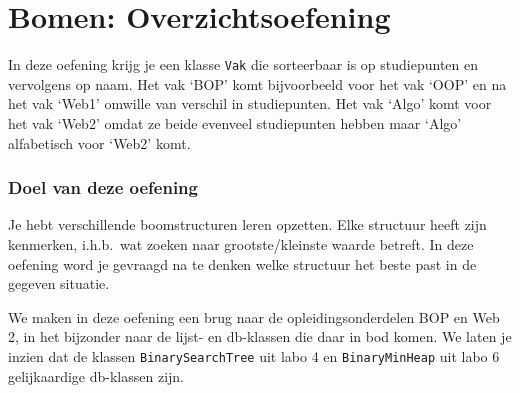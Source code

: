 \chapter{Bomen: Overzichtsoefening}

In deze oefening krijg je een klasse \verb/Vak/ die sorteerbaar is op studiepunten en vervolgens op naam. Het vak `BOP' komt bijvoorbeeld voor het vak `OOP' en na het vak `Web1' omwille van verschil  in studiepunten. Het vak `Algo' komt voor het vak `Web2' omdat ze beide evenveel studiepunten hebben maar `Algo' alfabetisch voor `Web2' komt.

\subsection*{Doel van deze oefening}
Je hebt verschillende boomstructuren leren opzetten. Elke structuur heeft zijn kenmerken, i.h.b.\ wat zoeken naar grootste/kleinste waarde betreft. In deze oefening word je gevraagd na te denken welke structuur het beste past in de gegeven situatie.

We maken in deze oefening een brug naar de opleidingsonderdelen BOP en Web 2, in het bijzonder naar de  lijst- en db-klassen die daar in bod komen. We laten je inzien dat de klassen  \verb/BinarySearchTree/ uit labo 4  en \verb/BinaryMinHeap/ uit labo 6 gelijkaardige db-klassen zijn. 

\newpage
